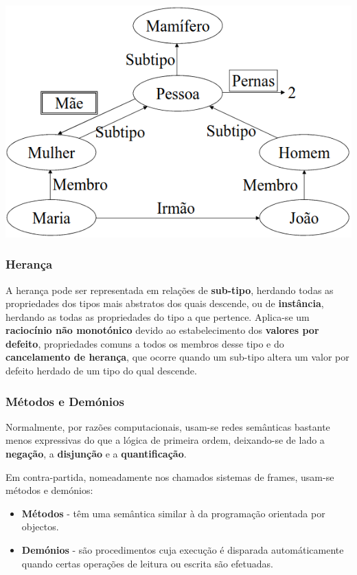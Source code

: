\documentclass{article}
\begin{document}
\begin{center}
  \includegraphics[scale=0.35]{21}
\end{center}

\subsubsection{Herança}

A herança pode ser representada em relações de \textbf{sub-tipo}, herdando todas as propriedades
dos tipos mais abstratos dos quais descende, ou de \textbf{instância}, herdando as todas as
propriedades do tipo a que pertence.
Aplica-se um \textbf{raciocínio não monotónico} devido ao estabelecimento dos \textbf{valores por defeito},
propriedades comuns a todos os membros desse tipo e do \textbf{cancelamento de herança}, que
ocorre quando um sub-tipo altera um valor por defeito herdado de um tipo do qual descende.

\subsubsection{Métodos e Demónios}

Normalmente, por razões computacionais, usam-se redes
semânticas bastante menos expressivas do que a lógica de primeira
ordem, deixando-se de lado a \textbf{negação}, a \textbf{disjunção} e a \textbf{quantificação}.

Em contra-partida, nomeadamente nos chamados sistemas de
frames, usam-se métodos e demónios:
\begin{itemize}
  \item \textbf{Métodos} - têm uma semântica similar à da programação orientada por objectos.
  \item \textbf{Demónios} - são procedimentos cuja execução é disparada automáticamente
  quando certas operações de leitura ou escrita são efetuadas.
\end{itemize}
\end{document}

